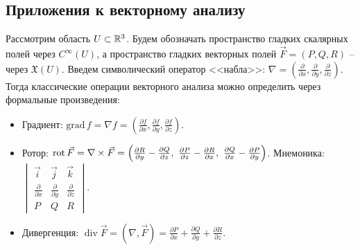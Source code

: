 

\subsection{Приложения к векторному анализу}

Рассмотрим область $U \subset \mathbb{R}^3$. Будем обозначать пространство гладких скалярных полей через $C^\infty(U)$, а пространство гладких векторных полей $\vec{F} = (P, Q, R)$ -- через $\mathfrak{X}(U)$.
Введем символический оператор <<набла>>: $\nabla = \left( \frac{\partial}{\partial x}, \frac{\partial}{\partial y}, \frac{\partial}{\partial z} \right)$.
Тогда классические операции векторного анализа можно определить через формальные произведения:
\begin{itemize}[itemsep = 0pt, topsep = 5pt]
    \item Градиент: $\text{grad}\, f = \nabla f = \left( \frac{\partial f}{\partial x}, \frac{\partial f}{\partial y}, \frac{\partial f}{\partial z} \right)$. 
    \item Ротор: $\operatorname{rot} \vec{F} = \nabla \times \vec{F}  = \left( \frac{\partial R}{\partial y} - \frac{\partial Q}{\partial z}, \ \frac{\partial P}{\partial z} - \frac{\partial R}{\partial x}, \ \frac{\partial Q}{\partial x} - \frac{\partial P}{\partial y} \right)$. Мнемоника: $\begin{vmatrix} \vec{i} & \vec{j} & \vec{k} \\ \frac{\partial}{\partial x} & \frac{\partial}{\partial y} & \frac{\partial}{\partial z} \\ P & Q & R \end{vmatrix}$.
    \item Дивергенция: $\operatorname{div} \vec{F} = (\nabla, \vec{F}) = \frac{\partial P}{\partial x} + \frac{\partial Q}{\partial y} + \frac{\partial R}{\partial z}$. 
\end{itemize}

